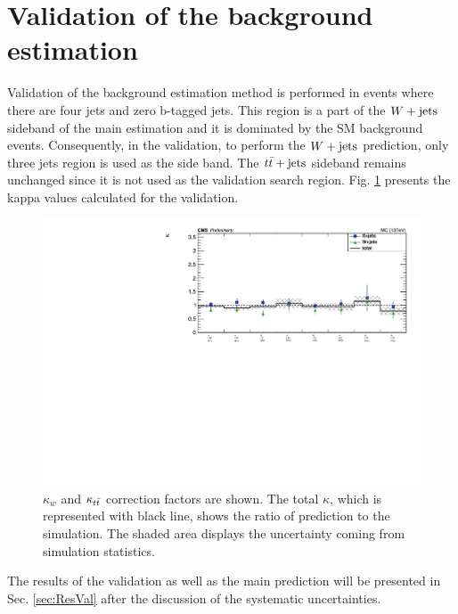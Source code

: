 \section{Validation of the background estimation}
\label{sec:Val}
Validation of the background estimation method is performed in events where there are four jets and zero b-tagged jets.
This region is a part of the $W+\textrm{jets}$ sideband of the main estimation and it is dominated by the SM background events. Consequently, in the validation, to perform the $W+\textrm{jets}$ prediction, only three jets region is used as the side band. The $t\bar{t}+\textrm{jets}$ sideband remains unchanged since it is not used as the validation search region. Fig. \ref{kappaVal} presents the kappa values calculated for the validation.
\begin{figure}[!hbt]
    \begin{center}
 \includegraphics[width=0.8 \textwidth]{Plots/analysis/RCS/Spring16_templates_validation_4j_Moriond2017_lep_data_Kappa}
  \caption{ \label{kappaVal}  $\kappa_w$ and $\kappa_{t\bar{t}}$ correction factors are shown. The total $\kappa$, which is represented with black line, shows the ratio of prediction to the simulation. The shaded area displays the uncertainty coming from simulation statistics.}
  \end{center}
\end{figure}
The results of the validation as well as the main prediction will be presented in Sec. \ref {sec:ResVal} after the discussion of the systematic uncertainties. 